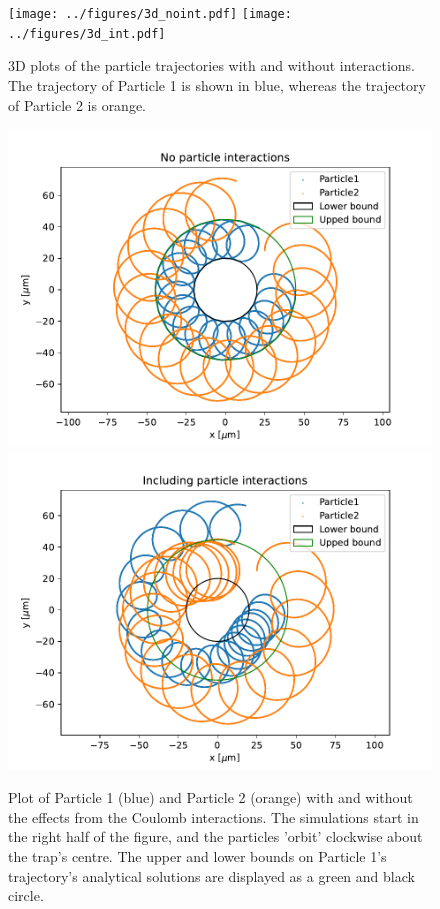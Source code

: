 \begin{figure}
\centering
\texttt{[image: ../figures/3d\_noint.pdf]}
\texttt{[image: ../figures/3d\_int.pdf]}
\caption{3D plots of the particle trajectories with and without interactions. The trajectory of Particle 1 is shown in blue, whereas the trajectory of Particle 2 is orange. }
\label{fig:3d}
\end{figure}

\begin{figure}
\centering
\includegraphics[scale=0.7]{../figures/xy_plane_noint.pdf}
\includegraphics[scale=0.7]{../figures/xy_plane_int.pdf}
\caption{Plot of Particle 1 (blue) and Particle 2 (orange) with and without
the effects from the Coulomb interactions. The simulations start in the right half of the
figure, and the particles 'orbit' clockwise about the trap's centre. The upper and lower bounds on Particle 1's trajectory's analytical solutions are displayed as a green and black circle.} %
\label{fig:xy_plane}
\end{figure}

